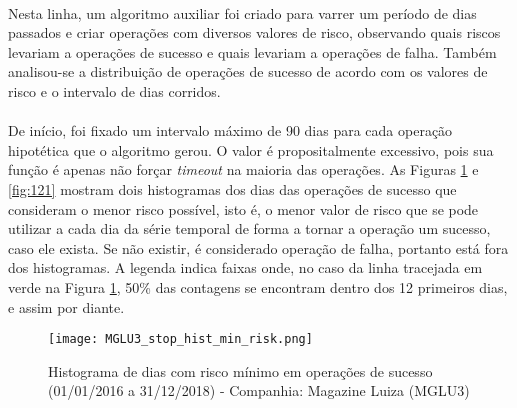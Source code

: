 

\paragraph{} Nesta linha, um algoritmo auxiliar foi criado para varrer um período de dias passados e criar operações com diversos valores de risco, observando quais riscos levariam a operações de sucesso e quais levariam a operações de falha. Também analisou-se a distribuição de operações de sucesso de acordo com os valores de risco e o intervalo de dias corridos.

\paragraph{} De início, foi fixado um intervalo máximo de 90 dias para cada operação hipotética que o algoritmo gerou. O valor é propositalmente excessivo, pois sua função é apenas não forçar \textit{timeout} na maioria das operações. As Figuras \ref{fig:120} e \ref{fig:121} mostram dois histogramas dos dias das operações de sucesso que consideram o menor risco possível, isto é, o menor valor de risco que se pode utilizar a cada dia da série temporal de forma a tornar a operação um sucesso, caso ele exista. Se não existir, é considerado operação de falha, portanto está fora dos histogramas. A legenda indica faixas onde, no caso da linha tracejada em verde na Figura \ref{fig:120}, 50\% das contagens se encontram dentro dos 12 primeiros dias, e assim por diante.

\begin{figure}[!htb]
    \texttt{[image: MGLU3\_stop\_hist\_min\_risk.png]}
    \centering
    \caption{Histograma de dias com risco mínimo em operações de sucesso (01/01/2016 a 31/12/2018) - Companhia: Magazine Luiza (MGLU3)}
    \label{fig:120}
\end{figure}

